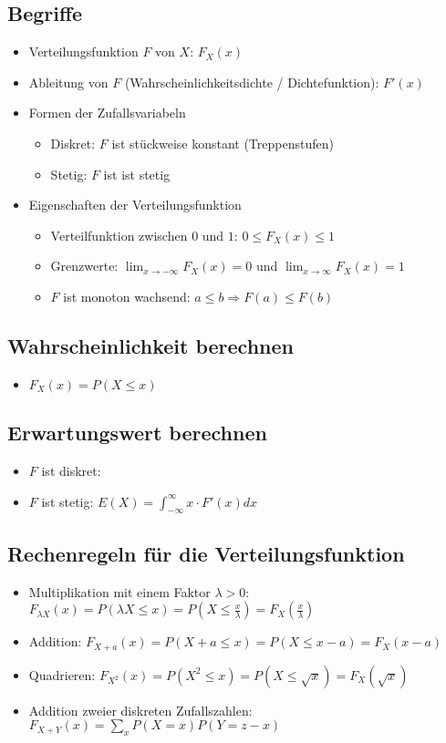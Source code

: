 \subsection{Begriffe}
\begin{itemize}
  \item Verteilungsfunktion $F$ von $X$: $F_X(x)$
  \item Ableitung von $F$ (Wahrscheinlichkeitsdichte / Dichtefunktion):
    $F'(x)$
  \item Formen der Zufallsvariabeln
  \begin{itemize}
    \item Diskret: $F$ ist stückweise konstant (Treppenstufen)
    \item Stetig: $F$ ist ist stetig
  \end{itemize}
  \item Eigenschaften der Verteilungsfunktion
  \begin{itemize}
    \item Verteilfunktion zwischen $0$ und $1$: $0 \le F_X(x) \le 1$
    \item Grenzwerte: $\lim_{x \to -\infty} F_X(x) = 0$ 
      und $\lim_{x \to \infty} F_X(x) = 1$
    \item $F$ ist monoton wachsend: $a \le b \Rightarrow F(a) \le F(b)$
  \end{itemize}
\end{itemize}

\subsection{Wahrscheinlichkeit berechnen}
\begin{itemize}
   \item $F_X(x) = P(X \le x)$
\end{itemize}

\subsection{Erwartungswert berechnen}
\begin{itemize}
  \item $F$ ist diskret: %
  \item $F$ ist stetig: $E(X) = \int_{-\infty}^{\infty}x \cdot F'(x)dx$
\end{itemize}

\subsection{Rechenregeln für die Verteilungsfunktion}
\begin{itemize}
  \item Multiplikation mit einem Faktor $\lambda > 0$: $F_{\lambda X}(x)=
    P(\lambda X \le x) = P(X \le \frac{x}{\lambda}) =
    F_X(\frac{x}{\lambda})$
  \item Addition: $F_{X+a}(x) = P(X+a \le x) = P(X \le x-a) = F_X(x-a)$
  \item Quadrieren: $F_{X^2}(x) = P(X^2 \le x) = P(X \le \sqrt{x}) =
    F_X(\sqrt{x})$
  \item Addition zweier diskreten Zufallszahlen:
    $F_{X+Y}(x) = \sum_x P(X=x)P(Y=z-x)$
\end{itemize}

